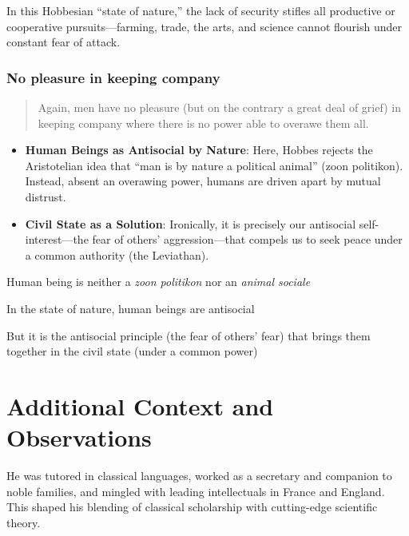             \begin{remark}
                 In this Hobbesian “state of nature,” the lack of security stifles all productive or cooperative pursuits—farming, trade, the arts, and science cannot flourish under constant fear of attack.
            \end{remark}

        \subsubsection{No pleasure in keeping company}

            \begin{quote}
                Again, men have no pleasure (but on the contrary a great deal of grief) in keeping company where there is no power able to overawe them all.
            \end{quote}

            \begin{itemize}
                \item \textbf{Human Beings as Antisocial by Nature}: Here, Hobbes rejects the Aristotelian idea that “man is by nature a political animal” (zoon politikon). Instead, absent an overawing power, humans are driven apart by mutual distrust.
                \item \textbf{Civil State as a Solution}: Ironically, it is precisely our antisocial self-interest—the fear of others’ aggression—that compels us to seek peace under a common authority (the Leviathan).
            \end{itemize}

    \begin{remark}
        Human being is neither a \textit{zoon politikon} nor an \textit{animal sociale}

        In the state of nature, human beings are antisocial

        But it is the antisocial principle (the fear of others’ fear) that brings them together in the civil state (under a common power)
    \end{remark}

\section*{Additional Context and Observations}

    \begin{remark}
        He was tutored in classical languages, worked as a secretary and companion to noble families, and mingled with leading intellectuals in France and England. This shaped his blending of classical scholarship with cutting-edge scientific theory.
    \end{remark}

